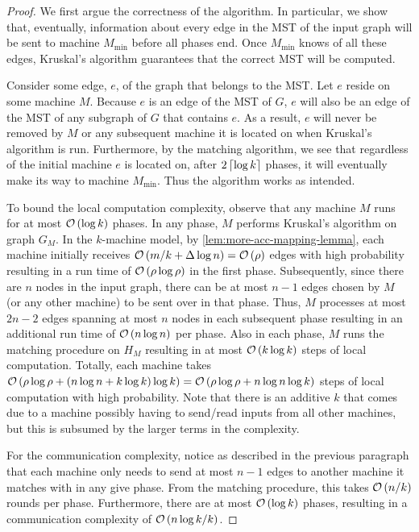 \begin{proof}
We first argue the correctness of the algorithm. In particular, we show that, eventually, information about every edge in the MST of the input graph will be sent to machine $M_{\min}$ before all phases end. Once $M_{\min}$ knows of all these edges, Kruskal's algorithm guarantees that the correct MST will be computed. 

Consider some edge, $e$, of the graph that belongs to the MST. Let $e$ reside on some machine $M$. Because $e$ is an edge of the MST of $G$, $e$ will also be an edge of the MST of any subgraph of $G$ that contains $e$. As a result, $e$ will never be removed by $M$ or any subsequent machine it is located on when Kruskal's algorithm is run. Furthermore, by the matching algorithm, we see that regardless of the initial machine $e$ is located on, after $2 \left\lceil\log k\right\rceil$ phases, it will eventually make its way to machine $M_{\min}$. Thus the algorithm works as intended.

To bound the local computation complexity, observe that any machine $M$ runs for at most $\mathcal{O}\left(\log k\right)$ phases. 
In any phase, $M$ performs Kruskal's algorithm on graph $G_M$. In the $k$-machine model, by
\cref{lem:more-acc-mapping-lemma}, each machine initially receives $\mathcal{O}\left(m/k + \Delta \log n\right) = \mathcal{O}\left(\rho\right)$ edges
with high probability
 resulting in a run time of $\mathcal{O}\left(\rho \log \rho\right)$ in the first phase. Subsequently, since there are $n$ nodes in the input graph, there can be at most $n-1$ edges chosen by $M$ (or any other machine) to be sent over in that phase. Thus, $M$ processes at most $2n-2$ edges spanning at most $n$ nodes in each subsequent phase resulting in an additional run time of $\mathcal{O}\left(n \log n\right)$ per phase. Also in each phase, $M$ runs the matching procedure on $H_M$ resulting in at most $\mathcal{O}\left(k \log k\right)$ steps of local computation. Totally, each machine takes $\mathcal{O}\left(\rho \log \rho + (n \log n  + k \log k)\log k\right) = \mathcal{O}\left(\rho \log \rho + n \log n \log k\right)$ steps of local computation with high probability. Note that there is an additive $k$ that comes due to a machine possibly having to send/read inputs from all other machines, but this is subsumed by the larger terms in the complexity.

For the communication complexity, notice as described in the previous paragraph that each machine only needs to send at most $n-1$ edges to another machine it matches with in any give phase. From the matching procedure, this takes $\mathcal{O}\left(n/k\right)$ rounds per phase. Furthermore, there are at most $\mathcal{O}\left(\log k\right)$ phases, resulting in a communication complexity of $\mathcal{O}\left(n\log k/k\right)$.
\end{proof}
